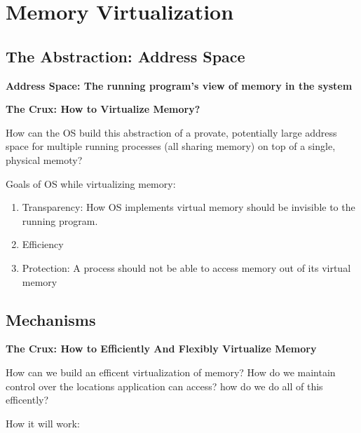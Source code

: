 \chapter{Memory Virtualization}

\section{The Abstraction: Address Space}

\textbf{Address Space: The running program's view of memory in the system}\\

\begin{tcolorbox}
    \begin{center}
        \textbf{The Crux: How to Virtualize Memory?}
    \end{center}

    How can the OS build this abstraction of a provate, potentially large
    address space for multiple running processes (all sharing memory) on 
    top of a single, physical memoty?
\end{tcolorbox}

Goals of OS while virtualizing memory:

\begin{enumerate}
    \item Transparency: How OS implements virtual memory should be invisible
        to the running program.
    \item Efficiency
    \item Protection: A process should not be able to access memory out of
        its virtual memory
\end{enumerate}

\section{Mechanisms}

\begin{tcolorbox}
    \begin{center}
        \textbf{The Crux: How to Efficiently And Flexibly Virtualize Memory}
    \end{center}

    How can we build an efficent virtualization of memory? How do we maintain
    control over the locations application can access? how do we do all of
    this efficently?
\end{tcolorbox}

How it will work:


